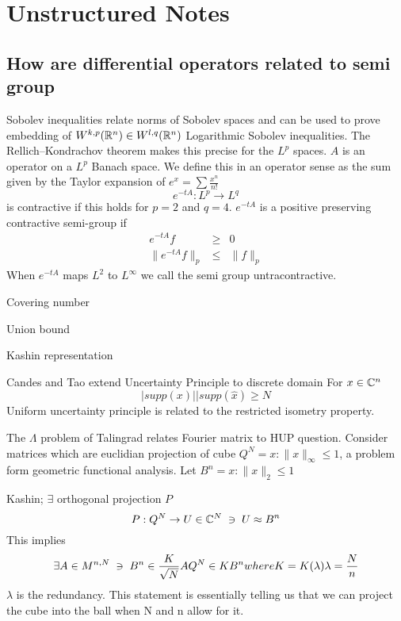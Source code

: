 \chapter{Unstructured Notes}
\section{How are differential operators related to semi group}
Sobolev inequalities relate norms of Sobolev spaces and can be used to prove embedding of $W^{k,p}(\mathbb R^n) \in W^{l,q}(\mathbb R^n)$ Logarithmic Sobolev inequalities.  The Rellich–Kondrachov theorem makes this precise for the $L^p$ spaces.
$A$ is an operator on a $L^p$ Banach space. We define this in an operator sense as the sum given by the Taylor expansion of $e^x = \sum \frac{x^n}{n!}$
\begin{equation*}
  e^{-t A} : L^p \rightarrow L^q
\end{equation*} is contractive if this holds for $p=2$ and $q=4$.
$e^{-t A}$ is a positive preserving contractive semi-group if
\begin{eqnarray*}
  e^{-t A} f &\geq& 0 \\
  \parallel e^{-t A} f \parallel_p &\leq& \parallel f \parallel_p
\end{eqnarray*}
When $e^{-t A}$ maps $L^2$ to $L^\infty$ we call the semi group untracontractive.

Covering number

Union bound

Kashin representation

Candes and Tao extend Uncertainty Principle to discrete domain
For $x \in \mathbb C^n$
\begin{equation*}
  |supp(x)| |supp(\hat{x}) \geq N
\end{equation*}
Uniform uncertainty principle is related to the restricted isometry property.

The $\Lambda$ problem of Talingrad relates Fourier matrix to HUP question.  Consider matrices which are euclidian projection of cube $Q^N = {x : \parallel x \parallel_\infty  \leq 1}$, a problem form geometric functional analysis.  Let $B^n = {x : \parallel x \parallel_2  \leq 1}$

Kashin; $\exists$ orthogonal projection $P$
\begin{equation*}
  P : Q^N \rightarrow U \in \mathbb C^N \; \ni \; U \approx B^n
\end{equation*}
This implies
\begin{equation*}
  \exists A \in M^{n,N} \; \ni \; B^n \in \frac{K}{\sqrt{N}} A Q^N \in K B^n where K = K(\lambda) \lambda=\frac{N}{n}
\end{equation*}
$\lambda$ is the redundancy.  This statement is essentially telling us that we can project the cube into the ball when N and n allow for it.

